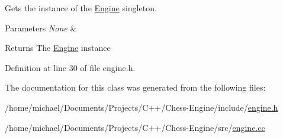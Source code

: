 Gets the instance of the \mbox{\hyperlink{classEngine}{Engine}} singleton. 


\begin{DoxyParams}{Parameters}
{\em None} & \\
\hline
\end{DoxyParams}
\begin{DoxyReturn}{Returns}
The \mbox{\hyperlink{classEngine}{Engine}} instance 
\end{DoxyReturn}


Definition at line 30 of file engine.\+h.



The documentation for this class was generated from the following files\+:\begin{DoxyCompactItemize}
\item 
/home/michael/\+Documents/\+Projects/\+C++/\+Chess-\/\+Engine/include/\mbox{\hyperlink{engine_8h}{engine.\+h}}\item 
/home/michael/\+Documents/\+Projects/\+C++/\+Chess-\/\+Engine/src/\mbox{\hyperlink{engine_8cc}{engine.\+cc}}\end{DoxyCompactItemize}
